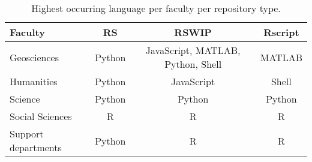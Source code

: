 
\begin{table}[h!]
\centering
\begin{tabular}{lccc}
\toprule
Faculty &      RS &                              RSWIP & Rscript \\
\midrule
Geosciences         &  Python &  JavaScript, MATLAB, Python, Shell &  MATLAB \\
Humanities          &  Python &                         JavaScript &   Shell \\
Science             &  Python &                             Python &  Python \\
Social Sciences     &       R &                                  R &       R \\
Support departments &  Python &                                  R &       R \\
\bottomrule
\end{tabular}
\caption{Highest occurring language per faculty per repository type.}
\label{tab:highest_language}
\end{table}
